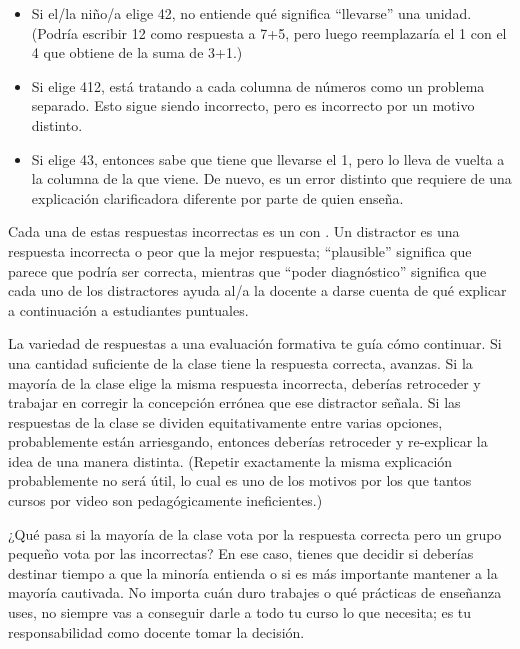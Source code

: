 \begin{itemize}

\item
  Si el/la niño/a elige 42,
no entiende qué significa ``llevarse'' una unidad.
(Podría escribir 12 como respuesta a 7+5,
pero luego reemplazaría el 1 con el 4 que obtiene de la suma de 3+1.)
\item
 Si elige 412,
está tratando a cada columna de números como un problema separado.
Esto sigue siendo incorrecto,
pero es incorrecto por un motivo distinto.

\item
Si elige 43, entonces sabe que tiene que llevarse el 1,
pero lo lleva de vuelta a la columna de la que viene.
De nuevo,
es un error distinto
que requiere de una explicación clarificadora diferente por parte de quien enseña.  
\end{itemize}

Cada una de estas respuestas incorrectas es un 
con .
Un distractor es una respuesta incorrecta o peor que la mejor respuesta;
``plausible'' significa que parece que podría ser correcta,
mientras que ``poder diagnóstico'' significa que cada uno de los distractores ayuda al/a la docente a darse cuenta de qué explicar a continuación a estudiantes puntuales.

La variedad de respuestas a una evaluación formativa te guía cómo continuar.
Si una cantidad suficiente de la clase tiene la respuesta correcta, avanzas.
Si la mayoría de la clase elige la misma respuesta incorrecta,
deberías retroceder y trabajar en corregir la concepción errónea que ese distractor señala.
Si las respuestas de la clase se dividen equitativamente entre varias opciones, probablemente están arriesgando, entonces deberías retroceder y re-explicar la idea de una manera distinta.
(Repetir exactamente la misma explicación probablemente no será útil,
lo cual es uno de los motivos por los que tantos cursos por video son pedagógicamente ineficientes.)

¿Qué pasa si la mayoría de la clase vota por la respuesta correcta
pero un grupo pequeño vota por las incorrectas?
En ese caso, 
tienes que decidir si deberías destinar tiempo a que la minoría entienda
o si es más importante mantener a la mayoría cautivada.
No importa cuán duro trabajes o qué prácticas de enseñanza uses,
no siempre vas a conseguir darle a todo tu curso lo que necesita;
es tu responsabilidad como docente tomar la decisión.


